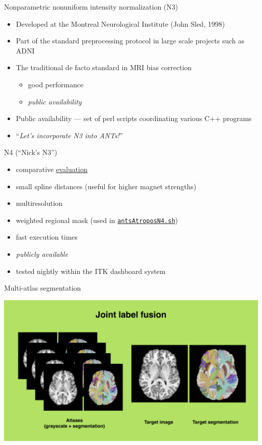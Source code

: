 \documentclass[ignorenonframetext,]{beamer}
\providecommand{\tightlist}{%
  \setlength{\itemsep}{0pt}\setlength{\parskip}{0pt}}
\begin{document}
\begin{frame}{Nonparametric nonuniform intensity normalization (N3)}

\begin{itemize}
\item
  Developed at the Montreal Neurological Institute (John Sled, 1998)
\item
  Part of the standard preprocessing protocol in large scale projects
  such as ADNI
\item
  The traditional de facto standard in MRI bias correction

  \begin{itemize}
  \tightlist
  \item
    good performance
  \item
    \emph{public availability}
  \end{itemize}
\item
  Public availability --- set of perl scripts coordinating various C++
  programs
\item
  ``\emph{Let's incorporate N3 into ANTs!}''
\end{itemize}

\end{frame}

\begin{frame}[fragile]{N4 (``Nick's N3'')}

\begin{itemize}
\item
  comparative
  \href{http://www.ncbi.nlm.nih.gov/pubmed/20378467}{evaluation}
\item
  small spline distances (useful for higher magnet strengths)
\item
  multiresolution
\item
  weighted regional mask (used in
  \href{https://github.com/stnava/ANTs/blob/master/Scripts/antsAtroposN4.sh}{\texttt{antsAtroposN4.sh}})
\item
  fast execution times
\item
  \emph{publicly available}
\item
  tested nightly within the ITK dashboard system
\end{itemize}

\end{frame}

\begin{frame}{Multi-atlas segmentation}

\includegraphics{./tools/jointfusion/figures/jointLabelFusion.png}

\end{frame}
\end{document}
